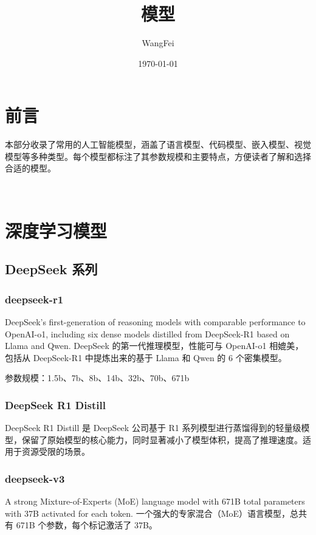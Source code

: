 \documentclass[12pt,UTF8]{ctexbook}
\title{\heiti\zihao{0} 模型}
\author{WangFei}
\date{\today}
\begin{document}
\maketitle
\tableofcontents

\frontmatter
\chapter{前言}

本部分收录了常用的人工智能模型，涵盖了语言模型、代码模型、嵌入模型、视觉模型等多种类型。每个模型都标注了其参数规模和主要特点，方便读者了解和选择合适的模型。

\mainmatter

~\\

\chapter{深度学习模型}

\section{DeepSeek 系列}

\subsection{deepseek-r1}

DeepSeek's first-generation of reasoning models with comparable performance to OpenAI-o1, including six dense models distilled from DeepSeek-R1 based on Llama and Qwen.
DeepSeek 的第一代推理模型，性能可与 OpenAI-o1 相媲美，包括从 DeepSeek-R1 中提炼出来的基于 Llama 和 Qwen 的 6 个密集模型。

参数规模：1.5b、7b、8b、14b、32b、70b、671b

\subsection{DeepSeek R1 Distill}

DeepSeek R1 Distill 是 DeepSeek 公司基于 R1 系列模型进行蒸馏得到的轻量级模型，保留了原始模型的核心能力，同时显著减小了模型体积，提高了推理速度。适用于资源受限的场景。

\subsection{deepseek-v3}

A strong Mixture-of-Experts (MoE) language model with 671B total parameters with 37B activated for each token.
一个强大的专家混合（MoE）语言模型，总共有 671B 个参数，每个标记激活了 37B。
\end{document}
